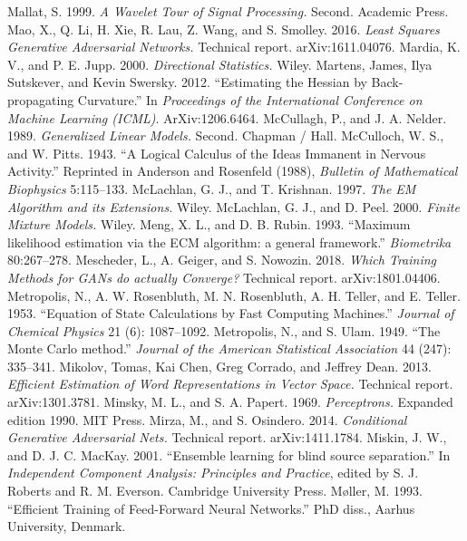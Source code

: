  Mallat, S. 1999. \emph{A Wavelet Tour of Signal Processing.} Second. Academic Press.
 Mao, X., Q. Li, H. Xie, R. Lau, Z. Wang, and S. Smolley. 2016. \emph{Least Squares Generative Adversarial Networks.} Technical report. arXiv:1611.04076.
 Mardia, K. V., and P. E. Jupp. 2000. \emph{Directional Statistics.} Wiley.
 Martens, James, Ilya Sutskever, and Kevin Swersky. 2012. ``Estimating the Hessian by Back-propagating Curvature.'' In \emph{Proceedings of the International Conference on Machine Learning (ICML)}. ArXiv:1206.6464.
 McCullagh, P., and J. A. Nelder. 1989. \emph{Generalized Linear Models.} Second. Chapman / Hall.
 McCulloch, W. S., and W. Pitts. 1943. ``A Logical Calculus of the Ideas Immanent in Nervous Activity.'' Reprinted in Anderson and Rosenfeld (1988), \emph{Bulletin of Mathematical Biophysics} 5:115--133.
 McLachlan, G. J., and T. Krishnan. 1997. \emph{The EM Algorithm and its Extensions.} Wiley.
 McLachlan, G. J., and D. Peel. 2000. \emph{Finite Mixture Models.} Wiley.
 Meng, X. L., and D. B. Rubin. 1993. ``Maximum likelihood estimation via the ECM algorithm: a general framework.'' \emph{Biometrika} 80:267--278.
 Mescheder, L., A. Geiger, and S. Nowozin. 2018. \emph{Which Training Methods for GANs do actually Converge?} Technical report. arXiv:1801.04406.
 Metropolis, N., A. W. Rosenbluth, M. N. Rosenbluth, A. H. Teller, and E. Teller. 1953. ``Equation of State Calculations by Fast Computing Machines.'' \emph{Journal of Chemical Physics} 21 (6): 1087--1092.
 Metropolis, N., and S. Ulam. 1949. ``The Monte Carlo method.'' \emph{Journal of the American Statistical Association} 44 (247): 335--341.
 Mikolov, Tomas, Kai Chen, Greg Corrado, and Jeffrey Dean. 2013. \emph{Efficient Estimation of Word Representations in Vector Space.} Technical report. arXiv:1301.3781.
 Minsky, M. L., and S. A. Papert. 1969. \emph{Perceptrons.} Expanded edition 1990. MIT Press.
 Mirza, M., and S. Osindero. 2014. \emph{Conditional Generative Adversarial Nets.} Technical report. arXiv:1411.1784.
 Miskin, J. W., and D. J. C. MacKay. 2001. ``Ensemble learning for blind source separation.'' In \emph{Independent Component Analysis: Principles and Practice}, edited by S. J. Roberts and R. M. Everson. Cambridge University Press.
 M\o ller, M. 1993. ``Efficient Training of Feed-Forward Neural Networks.'' PhD diss., Aarhus University, Denmark.
